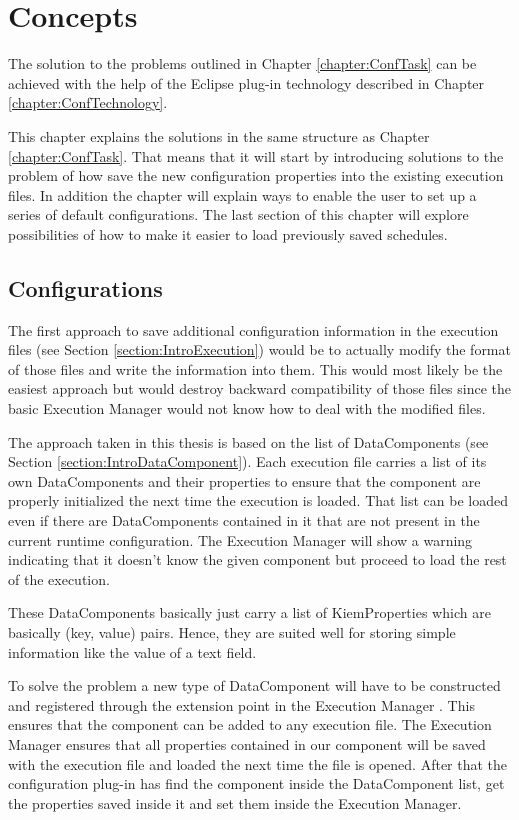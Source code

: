 \chapter{Concepts}
\label{chapter:ConfConcepts}
The solution to the problems outlined in Chapter \ref{chapter:ConfTask} can be achieved with
the help of the Eclipse plug-in technology described in Chapter \ref{chapter:ConfTechnology}.

This chapter explains the solutions in the same structure as Chapter \ref{chapter:ConfTask}.
That means that it will start by introducing solutions to the problem of how save the new
configuration properties into the existing execution files. In addition the chapter will
explain ways to enable the user to set up a series of default configurations. The last
section of this chapter will explore possibilities of how to make it easier to load
previously saved schedules.

\section{Configurations}
\label{section:ConfConceptsConf}
The first approach to save additional configuration information in the execution files (see Section \ref{section:IntroExecution}) would
be to actually modify the format of those files and write the information into them.
This would most likely be the easiest approach but would destroy backward compatibility of
those files since the basic Execution Manager would not know how to deal with the modified files.

The approach taken in this thesis is based on the list of DataComponents (see Section \ref{section:IntroDataComponent}). Each execution file 
carries a list of its own DataComponents and their properties to ensure
that the component are properly initialized the next time the execution is loaded. That list
can be loaded even if there are DataComponents contained in it that are not present in the current
runtime configuration. The Execution Manager will show a warning indicating that it doesn't know the given
component but proceed to load the rest of the execution. 

These DataComponents basically just carry a list of KiemProperties which are
basically (key, value) pairs. Hence, they are suited well for storing simple information like the value
of a text field.

To solve the problem a new type of DataComponent will have to be constructed and registered through
the extension point in the Execution Manager . This ensures that the component can be added to any execution
file. The Execution Manager  ensures that all properties contained in our component will be saved with
the execution file and loaded the next time the file is opened. After that the configuration plug-in has 
find the component inside the DataComponent list, get the properties saved inside it
and set them inside the Execution Manager.

